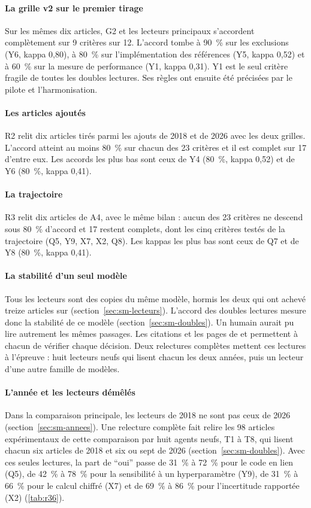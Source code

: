 \paragraph{La grille v2 sur le premier tirage}
Sur les mêmes dix articles, G2 et les lecteurs principaux s'accordent complètement sur 9 critères sur 12.
L'accord tombe à 90~\% sur les exclusions (Y6, kappa 0,80), à 80~\% sur l'implémentation des
références (Y5, kappa 0,52) et à 60~\% sur la mesure de performance (Y1, kappa 0,31). Y1 est le seul
critère fragile de toutes les doubles lectures. Ses règles ont ensuite été précisées par le pilote et
l'harmonisation.

\paragraph{Les articles ajoutés}
R2 relit dix articles tirés parmi les ajouts de 2018 et de 2026 avec les deux grilles. L'accord atteint
au moins 80~\% sur chacun des 23 critères et il est complet sur 17 d'entre eux. Les accords les plus bas
sont ceux de Y4 (80~\%, kappa 0,52) et de Y6 (80~\%, kappa 0,41).

\paragraph{La trajectoire}
R3 relit dix articles de A4, avec le même bilan : aucun des 23 critères ne descend sous 80~\% d'accord
et 17 restent complets, dont les cinq critères testés de la trajectoire (Q5, Y9, X7, X2, Q8). Les kappas les
plus bas sont ceux de Q7 et de Y8 (80~\%, kappa 0,41).

\paragraph{La stabilité d'un seul modèle}
Tous les lecteurs sont des copies du même modèle, hormis les deux qui ont achevé treize articles sur
 (section~\ref{sec:sm-lecteurs}). L'accord des doubles lectures mesure donc la
stabilité de ce modèle (section~\ref{sec:sm-doubles}). Un humain aurait pu
lire autrement les mêmes passages. Les citations et les pages de  et
 permettent à chacun de vérifier chaque décision. Deux relectures complètes
mettent ces lectures à l'épreuve : huit lecteurs neufs qui lisent chacun les deux années,
puis un lecteur d'une autre famille de modèles.

\paragraph{L'année et les lecteurs démêlés}\label{sec:sr-annees}
Dans la comparaison principale, les lecteurs de 2018 ne sont pas ceux de 2026
(section~\ref{sec:sm-annees}). Une relecture complète fait relire les 98 articles expérimentaux de cette comparaison par huit agents neufs, T1 à T8, qui lisent chacun six articles de 2018 et six ou sept de
2026 (section~\ref{sec:sm-doubles}). Avec ces seules lectures, la part de \enquote{oui} passe de 31~\%
à 72~\% pour le code en lien (Q5), de 42~\% à 78~\% pour la sensibilité à un hyperparamètre (Y9), de
31~\% à 66~\% pour le calcul chiffré (X7) et de 69~\% à 86~\% pour l'incertitude rapportée (X2)
(\cref{tab:r36}).

